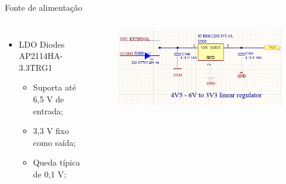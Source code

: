 \begin{frame}{Fonte de alimentação}
{            %






            \begin{columns}
                    \begin{itemize}
                        \item LDO Diodes AP2114HA-3.3TRG1
                        \begin{itemize}
                            \item Suporta até 6,5 V de entrada;
                            \item 3,3 V fixo como saída;
                            \item Queda típica de 0,1 V;
                        \end{itemize}
                    \end{itemize}
                    
                    \begin{figure}
                        \centering
                        \includegraphics[width=\textwidth]{figuras/cap3/esquematicos/power_2.png}
                    \end{figure}   



                
            \end{columns}
        }    
\end{frame}



